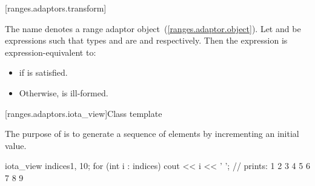 [ranges.adaptors.transform]{}

\pnum
The name  denotes a range adaptor
object~(\ref{ranges.adaptor.object}). Let  and  be expressions such
that types  and  are  and 
respectively. Then the expression  is expression-equivalent to:

\begin{itemize}
\item {} if
is satisfied.
\item Otherwise,  is ill-formed.
\end{itemize}

[ranges.adaptors.iota_view]{Class template }

\pnum
The purpose of  is to generate a sequence of elements by
 incrementing an initial value.


\pnum
\enterexample
\begin{codeblock}
iota_view indices{1, 10};
for (int i : indices)
  cout << i << ' '; // prints: 1 2 3 4 5 6 7 8 9
\end{codeblock}
\exitexample

